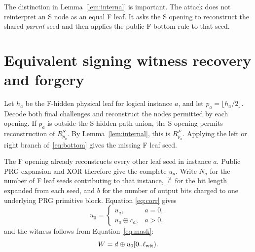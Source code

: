\documentclass[11pt,a4paper]{article}
\newcommand{\xor}{\mathbin{\oplus}}
\begin{document}
The distinction in Lemma~\ref{lem:internal} is important.  The attack does not
reinterpret an S node as an equal F leaf.  It asks the S opening to reconstruct
the shared \emph{parent} seed and then applies the public F bottom rule to that
seed.

\section{Equivalent signing witness recovery and forgery}

Let $h_a$ be the F-hidden physical leaf for logical instance $a$, and let
$p_a=\lfloor h_a/2\rfloor$.  Decode both final challenges and reconstruct the
nodes permitted by each opening.  If $p_a$ is outside the S hidden-path union,
the S opening permits reconstruction of $R_{p_a}^S$.  By
Lemma~\ref{lem:internal}, this is $R_{p_a}^F$.  Applying the left or right branch
of~\eqref{eq:bottom} gives the missing F leaf seed.

The F opening already reconstructs every other leaf seed in instance $a$.
Public PRG expansion and XOR therefore give the complete $u_a$.  Write $N_a$
for the number of F leaf seeds contributing to that instance,
$\widehat{\ell}$ for the bit length expanded from each seed, and $b$ for the
number of output bits charged to one underlying PRG primitive block.  Equation
\eqref{eq:corr} gives
\begin{equation}
 u_0=\begin{cases}
       u_a,&a=0,\\
       u_a\xor c_a,&a>0,
     \end{cases}                                             \label{eq:u0}
\end{equation}
and the witness follows from Equation~\eqref{eq:mask}:
\begin{equation}
                        W=d\xor u_0[0..\ell_{\rm wit}).       \label{eq:recover}
\end{equation}
\end{document}
